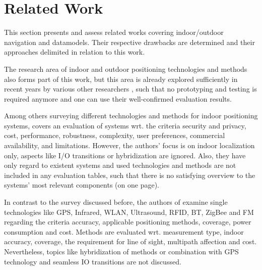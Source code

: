 \chapter{Related Work}


This section presents and assess related works covering indoor/outdoor navigation and datamodels. Their respective drawbacks are determined and their approaches delimited in relation to this work.

The research area of indoor and outdoor positioning technologies and methods also forms part of this work, but this area is already explored sufficiently in recent years by various other researchers , such that no prototyping and testing is required anymore and one can use their well-confirmed evaluation results.

Among others surveying different technologies and methods for indoor positioning systems, \cite{surveyIPS} covers an evaluation of systems wrt. the criteria security and privacy, cost, performance, robustness, complexity, user preferences, commercial availability, and limitations. However, the authors' focus is on indoor localization only, aspects like I/O transitions or hybridization are ignored. Also, they have only regard to existent systems and used technologies and methods are not included in any evaluation tables, such that there is no satisfying overview to the systems' most relevant components (on one page).

In contrast to the survey discussed before, the authors of \cite{recentAdvances} examine single technologies like GPS, Infrared, WLAN, Ultrasound, RFID, BT, ZigBee and FM regarding the criteria accuracy, applicable positioning methods, coverage, power consumption and cost. Methods are evaluated wrt. measurement type, indoor accuracy, coverage, the requirement for line of sight, multipath affection and cost. Nevertheless, topics like hybridization of methods or combination with GPS technology and seamless IO transitions are not discussed.



